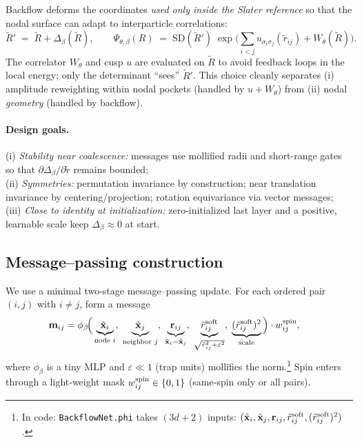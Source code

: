 Backflow deforms the coordinates \emph{used only inside the Slater reference} so that the nodal surface can adapt to interparticle correlations:
\begin{equation}
  \tilde{R}' \;=\; \tilde{R} + \Delta_\beta(\tilde{R}) ,
  \qquad
  \Psi_{\theta,\beta}(R) \;=\; \mathrm{SD}(\tilde R')\;
  \exp\!\Big(\sum_{i<j} u_{\sigma_i\sigma_j}(\tilde r_{ij}) + W_\theta(\tilde R)\Big).
  \label{eq:bf-def}
\end{equation}
The correlator $W_\theta$ and cusp $u$ are evaluated on $\tilde R$ to avoid feedback loops in the local energy; only the determinant ``sees'' $\tilde R'$.
This choice cleanly separates (i) amplitude reweighting within nodal pockets (handled by $u+W_\theta$) from (ii) nodal \emph{geometry} (handled by backflow).

\paragraph{Design goals.}
(i) \emph{Stability near coalescence:} messages use mollified radii and short-range gates so that $\partial \Delta_\beta/\partial \tilde r$ remains bounded; \\
(ii) \emph{Symmetries:} permutation invariance by construction; near translation invariance by centering/projection; rotation equivariance via vector messages; \\
(iii) \emph{Close to identity at initialization:} zero-initialized last layer and a positive, learnable scale keep $\Delta_\beta\!\approx\!0$ at start.

\subsection{Message–passing construction}
We use a minimal two-stage message–passing update. For each ordered pair $(i,j)$ with $i\neq j$, form a message
\begin{align}
  \mathbf m_{ij}
  &= \phi_\beta\!\Big(
      \underbrace{\tilde{\mathbf x}_i}_{\text{node $i$}},\;
      \underbrace{\tilde{\mathbf x}_j}_{\text{neighbor $j$}},\;
      \underbrace{\mathbf r_{ij}}_{\tilde{\mathbf x}_i-\tilde{\mathbf x}_j},\;
      \underbrace{\tilde r_{ij}^{\rm soft}}_{\sqrt{\tilde r_{ij}^2+\varepsilon^2}},\;
      \underbrace{(\tilde r_{ij}^{\rm soft})^2}_{\text{scale}}
    \Big)\cdot w_{ij}^{\rm spin},
  \label{eq:bf-message}
\end{align}
where $\phi_\beta$ is a tiny MLP and $\varepsilon\!\ll\!1$ (trap units) mollifies the norm.\footnote{In code: \texttt{BackflowNet.phi} takes $(3d+2)$ inputs: $(\tilde{\mathbf x}_i,\tilde{\mathbf x}_j,\mathbf r_{ij},\tilde r_{ij}^{\rm soft},(\tilde r_{ij}^{\rm soft})^2)$.}
Spin enters through a light‐weight mask $w_{ij}^{\rm spin}\in\{0,1\}$ (same‐spin only or all pairs).

